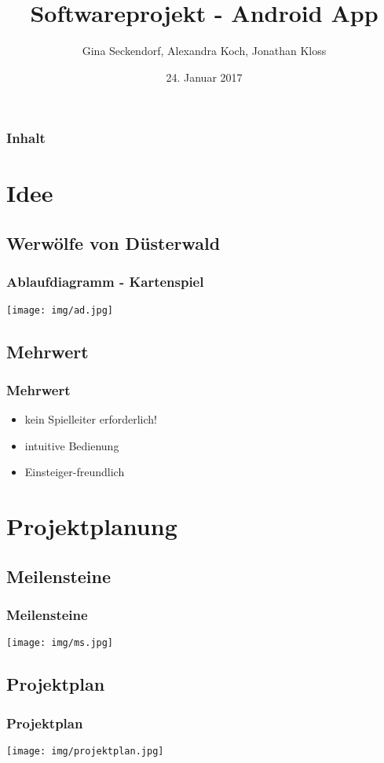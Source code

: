 \documentclass{beamer}
\title{Softwareprojekt - Android App}
\author{Gina Seckendorf, Alexandra Koch, Jonathan Kloss}
\date{24. Januar 2017}
\begin{document}
\begin{frame}[plain]
 \titlepage
\end{frame}


\section[Agenda]{}
\begin{frame}
\frametitle{Inhalt}
\tableofcontents
\end{frame}


\section{Idee}

	\subsection{Werwölfe von Düsterwald}
\begin{frame}
\frametitle{Ablaufdiagramm - Kartenspiel}
\texttt{[image: img/ad.jpg]}
\end{frame}

	\subsection{Mehrwert}
\begin{frame}
\frametitle{Mehrwert}
\begin{itemize}
\item kein Spielleiter erforderlich!
\item intuitive Bedienung
\item Einsteiger-freundlich
\end{itemize}
\end{frame}


\section{Projektplanung}

	\subsection{Meilensteine}
\begin{frame}
\frametitle{Meilensteine}
\texttt{[image: img/ms.jpg]}
\end{frame}

	\subsection{Projektplan}
\begin{frame}
\frametitle{Projektplan}
\vspace{0.3 cm}
\texttt{[image: img/projektplan.jpg]}
\end{frame}
\end{document}
